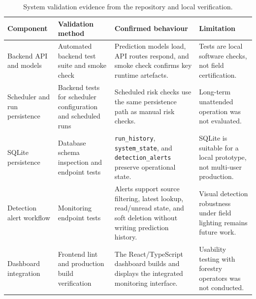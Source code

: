 \begin{table}[htbp]
\centering
\caption{System validation evidence from the repository and local verification.}
\label{tab:system-validation}
\begin{tabularx}{\textwidth}{l X X X}
\toprule
Component & Validation method & Confirmed behaviour & Limitation \\
\midrule
Backend API and models &
Automated backend test suite and smoke check &
Prediction models load, API routes respond, and smoke check confirms key
runtime artefacts. &
Tests are local software checks, not field certification. \\
Scheduler and run persistence &
Backend tests for scheduler configuration and scheduled runs &
Scheduled risk checks use the same persistence path as manual risk checks. &
Long-term unattended operation was not evaluated. \\
SQLite persistence &
Database schema inspection and endpoint tests &
\texttt{run\_history}, \texttt{system\_state}, and
\texttt{detection\_alerts} preserve operational state. &
SQLite is suitable for a local prototype, not multi-user production. \\
Detection alert workflow &
Monitoring endpoint tests &
Alerts support source filtering, latest lookup, read/unread state, and soft
deletion without writing prediction history. &
Visual detection robustness under field lighting remains future work. \\
Dashboard integration &
Frontend lint and production build verification &
The React/TypeScript dashboard builds and displays the integrated monitoring
interface. &
Usability testing with forestry operators was not conducted. \\
\bottomrule
\end{tabularx}
\end{table}
